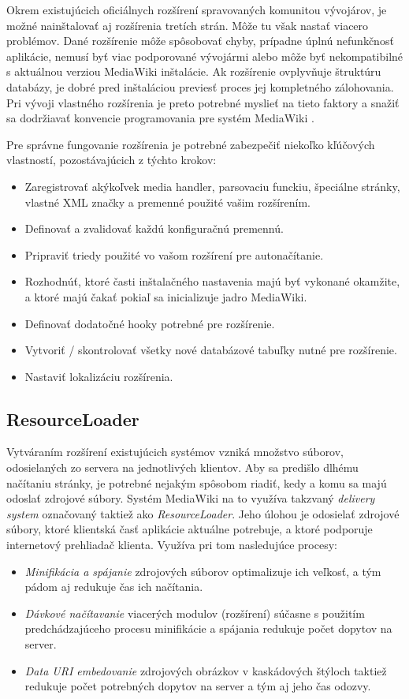 Okrem existujúcich oficiálnych rozšírení spravovaných komunitou vývojárov, je možné nainštalovať aj rozšírenia tretích strán. Môže tu však nastať viacero problémov. Dané rozšírenie môže spôsobovať chyby, prípadne úplnú nefunkčnosť aplikácie, nemusí byť viac podporované vývojármi alebo môže byť nekompatibilné s aktuálnou verziou MediaWiki inštalácie. Ak rozšírenie ovplyvňuje štruktúru databázy, je dobré pred inštaláciou previesť proces jej kompletného zálohovania. Pri vývoji vlastného rozšírenia je preto potrebné myslieť na tieto faktory a snažiť sa dodržiavať konvencie programovania pre systém MediaWiki \cite{MediaWikiConventions}. 

Pre správne fungovanie rozšírenia je potrebné zabezpečiť niekoľko kľúčových vlastností, pozostávajúcich z týchto krokov:
\begin{itemize}
	\item Zaregistrovať akýkoľvek media handler, parsovaciu funckiu, špeciálne stránky, vlastné XML značky a premenné použité vašim rozšírením.
	\item Definovať a zvalidovať každú konfiguračnú premennú.
	\item Pripraviť triedy použité vo vašom rozšírení pre autonačítanie.
	\item Rozhodnúť, ktoré časti inštalačného nastavenia majú byť vykonané okamžite, a ktoré majú čakať pokiaľ sa inicializuje jadro MediaWiki.
	\item Definovať dodatočné hooky potrebné pre rozšírenie.
	\item Vytvoriť / skontrolovať všetky nové databázové tabuľky nutné pre rozšírenie.
	\item Nastaviť lokalizáciu rozšírenia.
\end{itemize}

\subsection{ResourceLoader}
Vytváraním rozšírení existujúcich systémov vzniká množstvo súborov, odosielaných zo servera na jednotlivých klientov. Aby sa predišlo dlhému načítaniu stránky, je potrebné nejakým spôsobom riadiť, kedy a komu sa majú odoslať zdrojové súbory. Systém MediaWiki na to využíva takzvaný \textit{delivery system} označovaný taktiež ako \textit{ResourceLoader}. Jeho úlohou je odosielať zdrojové súbory, ktoré klientská časť aplikácie aktuálne potrebuje, a ktoré podporuje internetový prehliadač klienta. Využíva pri tom nasledujúce procesy:

\begin{itemize}
	\item \textit{Minifikácia a spájanie} zdrojových súborov optimalizuje ich veľkosť, a tým pádom aj redukuje čas ich načítania.
	\item \textit{Dávkové načítavanie} viacerých modulov (rozšírení) súčasne s použitím predchádzajúceho procesu minifikácie a spájania redukuje počet dopytov na server.
	\item \textit{Data URI embedovanie} zdrojových obrázkov v kaskádových štýloch taktiež redukuje počet potrebných dopytov na server a tým aj jeho čas odozvy.
\end{itemize}